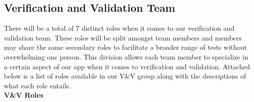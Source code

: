 \documentclass[12pt, titlepage]{article}
\begin{document}
\newpage
\subsection{Verification and Validation Team}

There will be a total of 7 distinct roles when it comes to our verification and validation team.
These roles will be split amongst team members and members may share the same secondary roles to facilitate a broader range of tests without overwhelming one person.
This division allows each team member to specialize in a certain aspect of our app when it comes to verification and validation. 
Attached below is a list of roles available in our V\&V group along with the descriptions of what each role entails. \\

\noindent \textbf{V\&V Roles}
\end{document}
